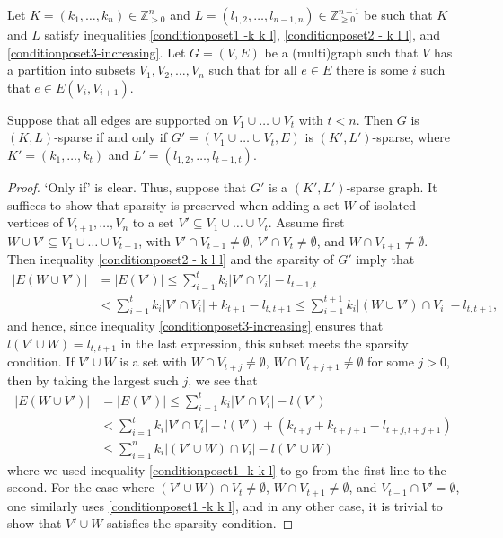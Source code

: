 \documentclass{article}
\begin{document}
\begin{lemma}
    Let $K=(k_1, \dots, k_n)\in  \mathbb{Z}_{>0}^{n}$ and $L= (l_{1,2}, \dots, l_{n-1,n})\in  \mathbb{Z}_{\geq 0}^{n-1}$ be such that $K$ and $L$ satisfy inequalities \eqref{conditionposet1 -k k l}, \eqref{conditionposet2 - k l l}, and \eqref{conditionposet3-increasing}. Let $G=(V,E)$ be a (multi)graph such that $V$ has a partition into subsets $V_1, V_2, \dots, V_n$ such that for all $e\in E$ there is some $i$ such that $e \in E(V_i, V_{i+1})$.
    
         Suppose that all edges are supported on $V_1\cup \dots \cup V_{t}$ with $t<n$. Then $G$ is $(K, L)$-sparse if and only if $G'= (V_1\cup \dots \cup V_{t}, E)$ is $(K',L')$-sparse, where $K'= (k_1, \dots, k_t)$ and $L'= (l_{1,2}, \dots, l_{t-1, t})$.
\end{lemma}
\begin{proof}
`Only if' is clear. Thus, suppose that $G'$ is a $(K',L')$-sparse graph. It suffices to show that sparsity is preserved when adding a set $W$ of isolated vertices of $V_{t+1}, \dots, V_n$ to a set $V' \subseteq V_{1}\cup \dots \cup V_t$. Assume first $W\cup V' \subseteq V_1\cup \dots \cup V_{t+1}$, with $V' \cap V_{t-1} \neq \emptyset$, $ V' \cap V_{t}\neq \emptyset$, and $W \cap V_{t+1} \neq \emptyset$. Then inequality \eqref{conditionposet2 - k l l} and the sparsity of $G'$ imply that
\begin{align*}
   \vert E(W\cup V') \vert&= \vert E(V') \vert \leq \sum_{i=1}^{t} k_i \vert V'\cap V_i\vert - l_{t-1,t}\\
&< \sum_{i=1}^{t} k_i \vert V' \cap V_i\vert + k_{t+1} - l_{t, t+1} \leq \sum_{i=1}^{t+1} k_i \vert (W\cup V') \cap V_i\vert - l_{t, t+1}, 
\end{align*}
and hence, since inequality \eqref{conditionposet3-increasing} ensures that $l(V' \cup W)=l_{t, t+1}$ in the last expression, this subset meets the sparsity condition.
If $V' \cup W$ is a set with $W \cap V_{t+j} \neq \emptyset$, $W \cap V_{t+j+1}\neq \emptyset$ for some $j > 0$, then by taking the largest such $j$, we see that 
\begin{align*}
\vert E(W\cup V') \vert&= \vert E(V') \vert \leq \sum_{i=1}^{t} k_i \vert V '\cap V_i\vert - l(V')\\
&<  \sum_{i=1}^{t} k_i \vert V '\cap V_i\vert - l(V') + (k_{t+j} + k_{t+j+1} - l_{t+j, t+j+1}) \\
&\leq \sum_{i=1}^{n} k_i \vert (V'\cup W) \cap V_i\vert - l(V'\cup W)
\end{align*}
where we used inequality \eqref{conditionposet1 -k k l} to go from the first line to the second. For the case where $(V'\cup W) \cap V_{t} \neq \emptyset$, $W \cap V_{t+1}\neq \emptyset$, and $V_{t-1}\cap V'= \emptyset$, one similarly uses  \eqref{conditionposet1 -k k l}, and in any other case, it is trivial to show that $V'\cup W$ satisfies the sparsity condition. 
\end{proof}
\end{document}
